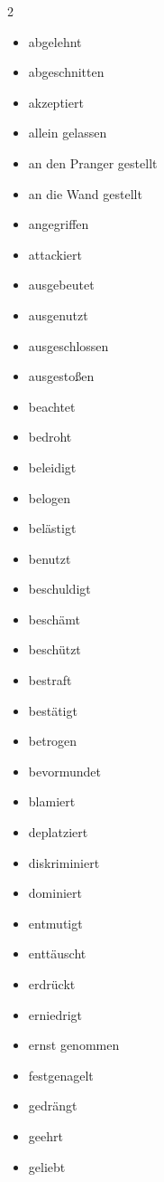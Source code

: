 \begin{multicols}{2}
    \begin{itemize}
        \item abgelehnt
        \item abgeschnitten
        \item akzeptiert
        \item allein gelassen
        \item an den Pranger gestellt
        \item an die Wand gestellt
        \item angegriffen
        \item attackiert
        \item ausgebeutet
        \item ausgenutzt
        \item ausgeschlossen
        \item ausgestoßen
        \item beachtet
        \item bedroht
        \item beleidigt
        \item belogen
        \item belästigt
        \item benutzt
        \item beschuldigt
        \item beschämt
        \item beschützt
        \item bestraft
        \item bestätigt
        \item betrogen
        \item bevormundet
        \item blamiert
        \item deplatziert
        \item diskriminiert
        \item dominiert
        \item entmutigt
        \item enttäuscht
        \item erdrückt
        \item erniedrigt
        \item ernst genommen
        \item festgenagelt
        \item gedrängt
        \item geehrt
        \item geliebt

\end{itemize}
\end{multicols}
